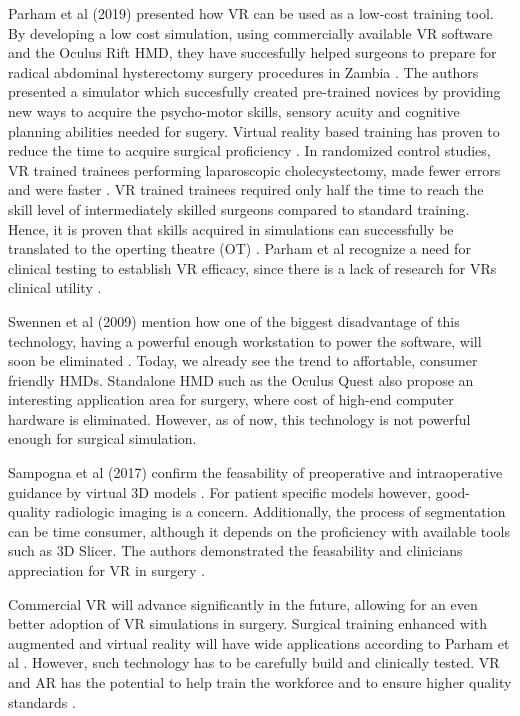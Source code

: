 Parham et al (2019) presented how VR can be used as a low-cost training tool.
By developing a low cost simulation, using commercially available VR software and the Oculus Rift HMD, they have succesfully helped surgeons to prepare for radical abdominal hysterectomy surgery procedures in Zambia \cite{Parham.2019}.
The authors presented a simulator which succesfully created pre-trained novices by providing new ways to acquire the psycho-motor skills, sensory acuity and cognitive planning abilities needed for sugery.
Virtual reality based training has proven to reduce the time to acquire surgical proficiency \cite{RN61,RN62}. 
In randomized control studies, VR trained trainees performing laparoscopic cholecystectomy, made fewer errors and were faster \cite{RN63,RN64}.
VR trained trainees required only half the time to reach the skill level of intermediately skilled surgeons compared to standard training.
Hence, it is proven that skills acquired in simulations can successfully be translated to the operting theatre (OT) \cite{RN63,RN64}.
Parham et al recognize a need for clinical testing to establish VR efficacy, since there is a lack of research for VRs clinical utility \cite{RN59}. 

Swennen et al (2009) mention how one of the biggest disadvantage of this technology, having a powerful enough workstation to power the software, will soon be eliminated \cite{swennen2009three}.
Today, we already see the trend to affortable, consumer friendly HMDs.
Standalone HMD such as the Oculus Quest also propose an interesting application area for surgery, where cost of high-end computer hardware is eliminated. 
However, as of now, this technology is not powerful enough for surgical simulation.

Sampogna et al (2017) confirm the feasability of preoperative and intraoperative guidance by virtual 3D models \cite{Sampogna.2017}.
For patient specific models however, good-quality radiologic imaging is a concern.
Additionally, the process of segmentation can be time consumer, although it depends on the proficiency with available tools such as 3D Slicer.
The authors demonstrated the feasability and clinicians appreciation for VR in surgery \cite{Sampogna.2017}.

Commercial VR will advance significantly in the future, allowing for an even better adoption of VR simulations in surgery.
Surgical training enhanced with augmented and virtual reality will have wide applications according to Parham et al \cite{RN61,RN62}.
However, such technology has to be carefully build and clinically tested.
VR and AR has the potential to help train the workforce and to ensure higher quality standards \cite{RN52}.

